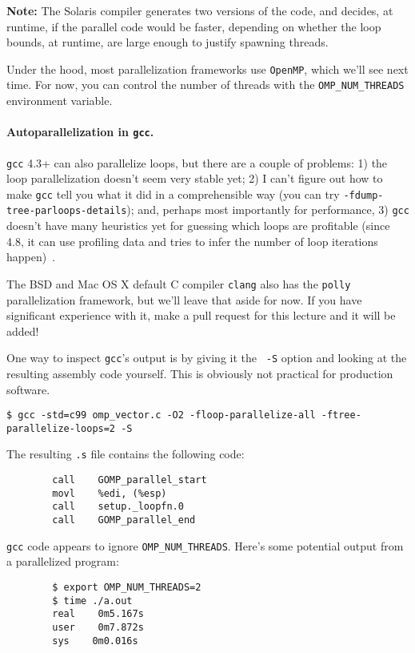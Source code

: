 {\bf Note:} The Solaris compiler generates two versions of the code,
and decides, at runtime, if the parallel code would be faster, depending on
whether the loop bounds, at runtime, are large enough to justify spawning
threads.

Under the hood, most parallelization frameworks use {\tt OpenMP},
which we'll see next time. For now, you can control the number of
threads with the {\tt OMP\_NUM\_THREADS} environment variable.

\paragraph{Autoparallelization in {\tt gcc}.} 
{\tt gcc} 4.3+ can also parallelize loops, but there are a couple of
problems: 1) the loop parallelization doesn't seem very stable yet; 2)
I can't figure out how to make {\tt gcc} tell you what it did in a comprehensible
way (you can try {\tt -fdump-tree-parloops-details}); and,
perhaps most importantly for performance, 3) {\tt gcc} doesn't have
many heuristics yet for guessing which loops are profitable (since 4.8, it can
use profiling data and tries to infer the number of loop iterations
happen)~\cite{autopar}.

The BSD and Mac OS X default C compiler {\tt clang} also has the {\tt polly} parallelization framework, but we'll leave that aside for now. If you have significant experience with it, make a pull request for this lecture and it will be added!

One way to inspect {\tt gcc}'s output is by giving it the {\tt
  -S} option and looking at the resulting assembly code yourself. This
is obviously not practical for production software.
\begin{verbatim}
$ gcc -std=c99 omp_vector.c -O2 -floop-parallelize-all -ftree-parallelize-loops=2 -S           
\end{verbatim}

The resulting {\tt .s} file contains the following code:

\begin{verbatim}
        call    GOMP_parallel_start
        movl    %edi, (%esp)
        call    setup._loopfn.0
        call    GOMP_parallel_end
\end{verbatim}
{\tt gcc} code appears to ignore \verb+OMP_NUM_THREADS+.  Here's
some potential output from a parallelized program:
\begin{verbatim}
        $ export OMP_NUM_THREADS=2
        $ time ./a.out
        real    0m5.167s
        user    0m7.872s
        sys    0m0.016s
\end{verbatim}


